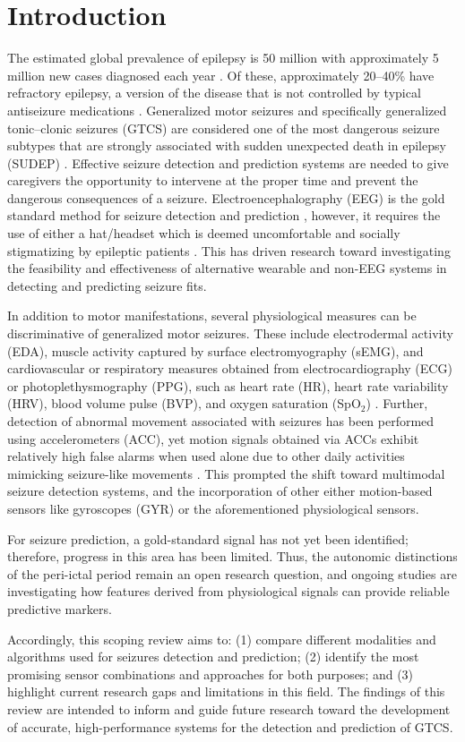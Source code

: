 \section{Introduction}
The estimated global prevalence of epilepsy is 50 million with approximately 5 million new cases diagnosed each year \cite{whoEpilepsy}. Of these, approximately 20–40\% have refractory epilepsy, a version of the disease that is not controlled by typical antiseizure medications \cite{Kwan2000-jq}. Generalized motor seizures and specifically generalized tonic–clonic seizures (GTCS) are considered one of the most dangerous seizure subtypes that are strongly associated with sudden unexpected death in epilepsy (SUDEP) \cite{Devinsky2016-tn}. Effective seizure detection and prediction systems are needed to give caregivers the opportunity to intervene at the proper time and prevent the dangerous consequences of a seizure. Electroencephalography (EEG) is the gold standard method for seizure detection \cite{Noachtar2009-am} and prediction \cite{Rasheed2021-de}, however, it requires the use of either a hat/headset which is deemed uncomfortable and socially stigmatizing by epileptic patients \cite{Hadady2025-gc}. This has driven research toward investigating the feasibility and effectiveness of alternative wearable and non-EEG systems in detecting and predicting seizure fits.

In addition to motor manifestations, several physiological measures can be discriminative of generalized motor seizures. These include electrodermal activity (EDA), muscle activity captured by surface electromyography (sEMG), and cardiovascular or respiratory measures obtained from electrocardiography (ECG) or photoplethysmography (PPG), such as heart rate (HR), heart rate variability (HRV), blood volume pulse (BVP), and oxygen saturation (SpO$_2$) \cite{Casanovas_Ortega2022-yx,Baumgartner2021-fv,Beniczky2016-ra,Baumgartner2019-wy}. Further, detection of abnormal movement associated with seizures has been performed using accelerometers (ACC), yet motion signals obtained via ACCs exhibit relatively high false alarms when used alone due to other daily activities mimicking seizure-like movements \cite{Atwood2021-ux}. This prompted the shift toward multimodal seizure detection systems, and the incorporation of other either motion-based sensors like gyroscopes (GYR) or the aforementioned physiological sensors.

For seizure prediction, a gold-standard signal has not yet been identified; therefore, progress in this area has been limited. Thus, the autonomic distinctions of the peri-ictal period remain an open research question, and ongoing studies are investigating how features derived from physiological signals can provide reliable predictive markers.

Accordingly, this scoping review aims to: (1) compare different modalities and algorithms used for seizures detection and prediction; (2) identify the most promising sensor combinations and approaches for both purposes; and (3) highlight current research gaps and limitations in this field. The findings of this review are intended to inform and guide future research toward the development of accurate, high-performance systems for the detection and prediction of GTCS.
